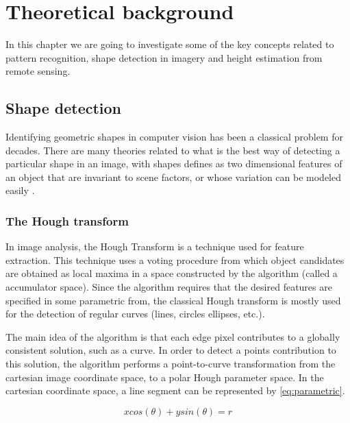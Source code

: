 \chapter{Theoretical background}
In this chapter we are going to investigate some of the key concepts related to pattern recognition, shape detection in imagery and height estimation from remote sensing. 

\section{Shape detection}
Identifying geometric shapes in computer vision has been a classical problem for decades. There are many theories related to what is the best way of detecting a particular shape in an image, with shapes defines as two dimensional features of an object that are invariant to scene factors, or whose variation can be modeled easily \citep{Moon2002}.

\subsection{The Hough transform}
In image analysis, the Hough Transform is a technique used for feature extraction. This technique uses a voting procedure from which object candidates are obtained as local maxima in a space constructed by the algorithm (called a accumulator space). Since the algorithm requires that the desired features are specified in some parametric from, the classical Hough transform is mostly used for the detection of regular curves (lines, circles ellipses, etc.).

The main idea of the algorithm is that each edge pixel contributes to a globally consistent solution, such as a curve. In order to detect a points contribution to this solution, the algorithm performs a point-to-curve transformation from the cartesian image coordinate space, to a polar Hough parameter space. In the cartesian coordinate space, a line segment can be represented by \autoref{eq:parametric}.

\begin{equation}
	xcos(\theta) + ysin(\theta) = r
	\label{eq:parametric}
\end{equation}


